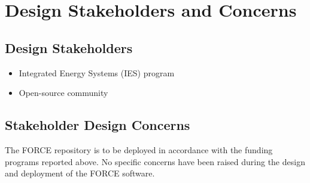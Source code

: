 \section{Design Stakeholders and Concerns}
\subsection{Design Stakeholders}
\begin{itemize}
  \item Integrated Energy Systems (IES) program 
  \item Open-source community 
\end{itemize}
\subsection{Stakeholder Design Concerns}
The FORCE repository is to be deployed in accordance with the funding programs reported above. No specific concerns have been raised during the design and deployment of the FORCE software.
